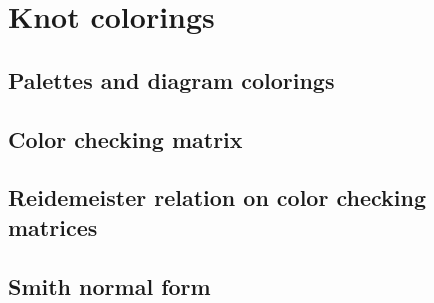 \section{Knot colorings}

\subsection{Palettes and diagram colorings}



\subsection{Color checking matrix}
\label{section 3.2}



\subsection{Reidemeister relation on color checking matrices}



\subsection{Smith normal form}



%
% 
%
%
%
% 
%
%
% 
%
%
%
%  
%
%
%  
